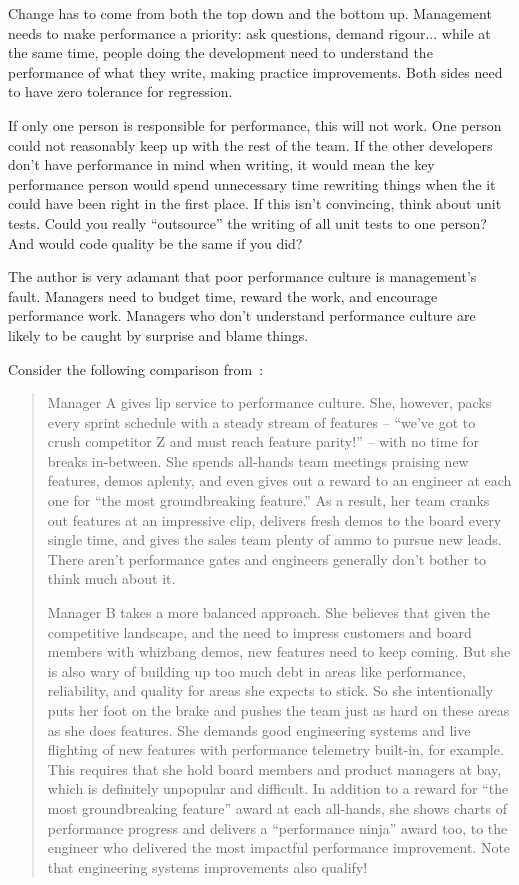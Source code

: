 Change has to come from both the top down and the bottom up. Management needs to make performance a priority: ask questions, demand rigour... while at the same time, people doing the development need to understand the performance of what they write, making practice improvements. Both sides need to have zero tolerance for regression.

If only one person is responsible for performance, this will not work. One person could not reasonably keep up with the rest of the team. If the other developers don't have performance in mind when writing, it would mean the key performance person would spend unnecessary time rewriting things when the it could have been right in the first place. If this isn't convincing, think about unit tests. Could you really ``outsource'' the writing of all unit tests to one person? And would code quality be the same if you did?

The author is very adamant that poor performance culture is management's fault. Managers need to budget time, reward the work, and encourage performance work. Managers who don't understand performance culture are likely to be caught by surprise and blame things. 

Consider the following comparison from~\cite{perfculture}:

\begin{quote}
Manager A gives lip service to performance culture. She, however, packs every sprint schedule with a steady stream of features -- ``we've got to crush competitor Z and must reach feature parity!'' -- with no time for breaks in-between. She spends all-hands team meetings praising new features, demos aplenty, and even gives out a reward to an engineer at each one for ``the most groundbreaking feature.'' As a result, her team cranks out features at an impressive clip, delivers fresh demos to the board every single time, and gives the sales team plenty of ammo to pursue new leads. There aren't performance gates and engineers generally don't bother to think much about it.

Manager B takes a more balanced approach. She believes that given the competitive landscape, and the need to impress customers and board members with whizbang demos, new features need to keep coming. But she is also wary of building up too much debt in areas like performance, reliability, and quality for areas she expects to stick. So she intentionally puts her foot on the brake and pushes the team just as hard on these areas as she does features. She demands good engineering systems and live flighting of new features with performance telemetry built-in, for example. This requires that she hold board members and product managers at bay, which is definitely unpopular and difficult. In addition to a reward for ``the most groundbreaking feature'' award at each all-hands, she shows charts of performance progress and delivers a ``performance ninja'' award too, to the engineer who delivered the most impactful performance improvement. Note that engineering systems improvements also qualify!
\end{quote}

